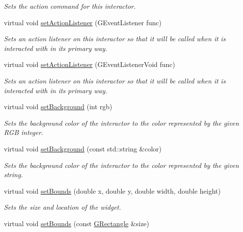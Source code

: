 \begin{DoxyCompactItemize}
\begin{DoxyCompactList}\small\item\em Sets the action command for this interactor. \end{DoxyCompactList}\item 
virtual void \mbox{\hyperlink{classGInteractor_adcfb4742430c88714fcf57e57ab8ea9c}{set\+Action\+Listener}} (G\+Event\+Listener func)
\begin{DoxyCompactList}\small\item\em Sets an action listener on this interactor so that it will be called when it is interacted with in its primary way. \end{DoxyCompactList}\item 
virtual void \mbox{\hyperlink{classGInteractor_aebd20a89c7a8a43a6fce999cf4f9fcf2}{set\+Action\+Listener}} (G\+Event\+Listener\+Void func)
\begin{DoxyCompactList}\small\item\em Sets an action listener on this interactor so that it will be called when it is interacted with in its primary way. \end{DoxyCompactList}\item 
virtual void \mbox{\hyperlink{classGInteractor_acba7e546c2025c0a15ca4b4cc92043db}{set\+Background}} (int rgb)
\begin{DoxyCompactList}\small\item\em Sets the background color of the interactor to the color represented by the given R\+GB integer. \end{DoxyCompactList}\item 
virtual void \mbox{\hyperlink{classGInteractor_ab4677ab2474e68b07aa56605af92a84a}{set\+Background}} (const std\+::string \&color)
\begin{DoxyCompactList}\small\item\em Sets the background color of the interactor to the color represented by the given string. \end{DoxyCompactList}\item 
virtual void \mbox{\hyperlink{classGInteractor_a2aae8197624b72265ab83b4f1bc73f2f}{set\+Bounds}} (double x, double y, double width, double height)
\begin{DoxyCompactList}\small\item\em Sets the size and location of the widget. \end{DoxyCompactList}\item 
virtual void \mbox{\hyperlink{classGInteractor_acada386653f008cacc7cce86426bef7c}{set\+Bounds}} (const \mbox{\hyperlink{structGRectangle}{G\+Rectangle}} \&size)

\end{DoxyCompactItemize}
